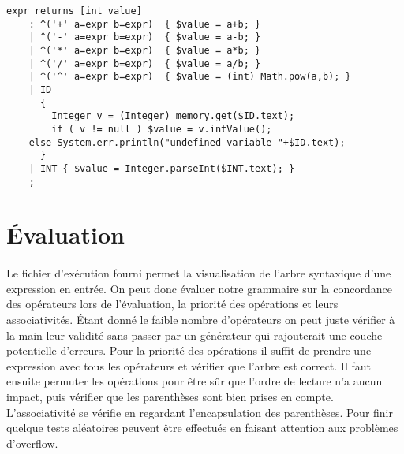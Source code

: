 \documentclass[paper=a4, fontsize=11pt]{scrartcl} %
\numberwithin{equation}{section} %
\numberwithin{figure}{section} %
\numberwithin{table}{section} %
\begin{document}
\begin{lstlisting}[label=eval_file,caption=Fichier Eval.g,
linebackgroundcolor={\lstcolorlines[orange!30]{6}\lstcolorlines[blue!30]{5}}]
expr returns [int value]
    : ^('+' a=expr b=expr)  { $value = a+b; }
    | ^('-' a=expr b=expr)  { $value = a-b; }
    | ^('*' a=expr b=expr)  { $value = a*b; }
    | ^('/' a=expr b=expr)  { $value = a/b; }
    | ^('^' a=expr b=expr)  { $value = (int) Math.pow(a,b); }
    | ID
      {
        Integer v = (Integer) memory.get($ID.text);
        if ( v != null ) $value = v.intValue();
	else System.err.println("undefined variable "+$ID.text);
      }
    | INT { $value = Integer.parseInt($INT.text); }
    ;
\end{lstlisting}




\section{Évaluation} %

\paragraph{}Le fichier d'exécution fourni permet la visualisation de l'arbre syntaxique
d'une expression en entrée. On peut donc évaluer notre grammaire sur la
concordance des opérateurs lors de l'évaluation, la priorité des opérations et
leurs associativités. Étant donné le faible nombre d'opérateurs on peut juste
vérifier à la main leur validité sans passer par un générateur qui rajouterait
une couche potentielle d'erreurs. Pour la priorité des opérations il suffit de
prendre une expression avec tous les opérateurs et vérifier que l'arbre est
correct. Il faut ensuite permuter les opérations pour être sûr que l'ordre de
lecture n'a aucun impact, puis vérifier que les parenthèses sont bien prises en
compte. L'associativité se vérifie en regardant l'encapsulation des parenthèses.
Pour finir quelque tests aléatoires peuvent être effectués en faisant attention
aux problèmes d'overflow.

\end{document}
